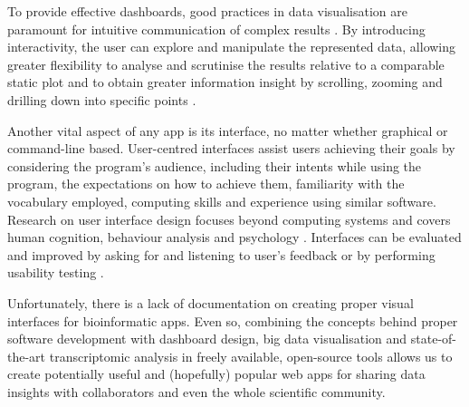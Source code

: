 To provide effective dashboards, good practices in data visualisation are paramount for intuitive communication of complex results \cite{tidwell:2019tf}. By introducing interactivity, the user can explore and manipulate the represented data, allowing greater flexibility to analyse and scrutinise the results relative to a comparable static plot and to obtain greater information insight by scrolling, zooming and drilling down into specific points \cite{tidwell:2019tf}.

Another vital aspect of any app is its interface, no matter whether graphical or command-line based. User-centred interfaces assist users achieving their goals by considering the program's audience, including their intents while using the program, the expectations on how to achieve them, familiarity with the vocabulary employed, computing skills and experience using similar software. Research on user interface design focuses beyond computing systems and covers human cognition, behaviour analysis and psychology \cite{silva:2017wl,hewitt:2019uj,tidwell:2019tf,alves:2020vu}. Interfaces can be evaluated and improved by asking for and listening to user's feedback or by performing usability testing \cite{tidwell:2019tf}.

Unfortunately, there is a lack of documentation on creating proper visual interfaces for bioinformatic apps. Even so, combining the concepts behind proper software development with dashboard design, big data visualisation and state-of-the-art transcriptomic analysis in freely available, open-source tools allows us to create potentially useful and (hopefully) popular web apps for sharing data insights with collaborators and even the whole scientific community.
